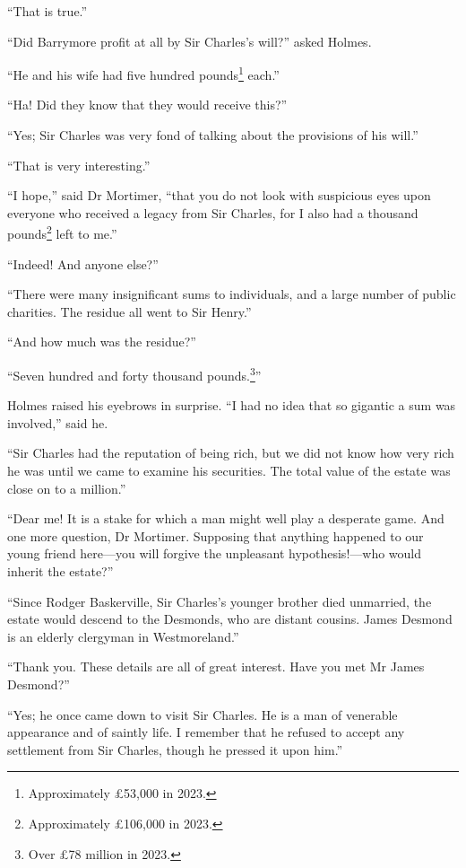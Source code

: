 \documentclass[paper=5.5in:8.5in,BCOR=7mm,twoside,DIV=calc,12pt,usegeometry,openany,chapterprefix,endperiod]{scrbook} %
\begin{document}
\enquote{That is true.}

\enquote{Did Barrymore profit at all by Sir Charles's will?} asked Holmes.

\enquote{He and his wife had five hundred pounds\footnote{Approximately \pounds 53,000 in 2023.} each.}

\enquote{Ha! Did they know that they would receive this?}

\enquote{Yes; Sir Charles was very fond of talking about the provisions of his will.}

\enquote{That is very interesting.}

\enquote{I hope,} said Dr Mortimer, \enquote{that you do not look with suspicious eyes upon everyone who received a legacy from Sir Charles, for I also had a thousand pounds\footnote{Approximately \pounds 106,000 in 2023.} left to me.}

\enquote{Indeed! And anyone else?}

\enquote{There were many insignificant sums to individuals, and a large number of public charities. The residue all went to Sir Henry.}

\enquote{And how much was the residue?}

\enquote{Seven hundred and forty thousand pounds.\footnote{Over \pounds 78 million in 2023.}}

Holmes raised his eyebrows in surprise. \enquote{I had no idea that so gigantic a sum was involved,} said he.

\enquote{Sir Charles had the reputation of being rich, but we did not know how very rich he was until we came to examine his securities. The total value of the estate was close on to a million.}

\enquote{Dear me! It is a stake for which a man might well play a desperate game. And one more question, Dr Mortimer. Supposing that anything happened to our young friend here\nobreakdash---you will forgive the unpleasant hypothesis!\nobreakdash---who would inherit the estate?}

\enquote{Since Rodger Baskerville, Sir Charles's younger brother died unmarried, the estate would descend to the Desmonds, who are distant cousins. James Desmond is an elderly clergyman in Westmoreland.}

\enquote{Thank you. These details are all of great interest. Have you met Mr James Desmond?}

\enquote{Yes; he once came down to visit Sir Charles. He is a man of venerable appearance and of saintly life. I remember that he refused to accept any settlement from Sir Charles, though he pressed it upon him.}
\end{document}
